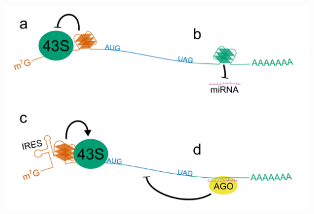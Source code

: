 \documentclass[12pt,a4paper,]{report}
\let\origfigure=\figure
\let\endorigfigure=\endfigure
\renewenvironment{figure}[1][2] {
    \expandafter\origfigure\expandafter[H]
} {
    \endorigfigure
}
\begin{document}
\begin{figure}[htbp]
\centering
\includegraphics[width=\textwidth,height=562pt,keepaspectratio]{introduction/figures/mRNA_stability_translation.png}
\caption[G4 function in translation and mRNA stability]{\textbf{G4   function   in   translation   and   mRNA   stability}   Schematic   showing   how   5’   and   3’   UTR   G4s   can   effect   translation   of   mRNAs.   \textbf{a)}   G4s   in   the   5’   UTR   of   mRNAs   can   cause   a   reduction   in   gene   expression   by   preventing   scanning   of   the   PIC   along   the   UTR.   \textbf{b)}   and   \textbf{d)}   G4   formation   in   the   3’UTR   could   block   the   recognition   of   miRNA   binding   sites   by   Argonaute   proteins.   \textbf{c)}   G4s   which   form   in   long   and   structured   5’   UTRs   can   contribute   to   internal   ribosome   entry   site   (IRES)   which   promote   cap   independent   initiation   of   translation}
\end{figure}
\end{document}

